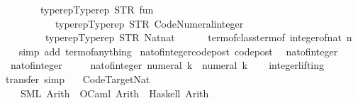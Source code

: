 \begin{isabellebody}
\ \ \ \ \ \ \ \ {\isacharparenleft}typerep{\isachardot}Typerep\ {\isacharparenleft}STR\ {\isacharprime}{\isacharprime}fun{\isacharprime}{\isacharprime}{\isacharparenright}\isanewline
\ \ \ \ \ \ \ \ \ \ \ {\isacharbrackleft}typerep{\isachardot}Typerep\ {\isacharparenleft}STR\ {\isacharprime}{\isacharprime}Code{\isacharunderscore}Numeral{\isachardot}integer{\isacharprime}{\isacharprime}{\isacharparenright}\ {\isacharbrackleft}{\isacharbrackright}{\isacharcomma}\isanewline
\ \ \ \ \ \ \ \ \ typerep{\isachardot}Typerep\ {\isacharparenleft}STR\ {\isacharprime}{\isacharprime}Nat{\isachardot}nat{\isacharprime}{\isacharprime}{\isacharparenright}\ {\isacharbrackleft}{\isacharbrackright}{\isacharbrackright}{\isacharparenright}{\isacharparenright}\isanewline
\ \ \ \ \ {\isacharparenleft}term{\isacharunderscore}of{\isacharunderscore}class{\isachardot}term{\isacharunderscore}of\ {\isacharparenleft}integer{\isacharunderscore}of{\isacharunderscore}nat\ n{\isacharparenright}{\isacharparenright}{\isachardoublequoteclose}\isanewline
%
\isadelimproof
\ \ %
\endisadelimproof
%
\isatagproof
{}\isamarkupfalse%
\ {\isacharparenleft}simp\ add{\isacharcolon}\ term{\isacharunderscore}of{\isacharunderscore}anything{\isacharparenright}%
\endisatagproof
{\isafoldproof}%
%
\isadelimproof
\isanewline
%
\endisadelimproof
\isanewline
{}\isamarkupfalse%
\ nat{\isacharunderscore}of{\isacharunderscore}integer{\isacharunderscore}code{\isacharunderscore}post\ {\isacharbrackleft}code{\isacharunderscore}post{\isacharbrackright}{\isacharcolon}\isanewline
\ \ {\isachardoublequoteopen}nat{\isacharunderscore}of{\isacharunderscore}integer\ {}\ {\isacharequal}\ {}{\isachardoublequoteclose}\isanewline
\ \ {\isachardoublequoteopen}nat{\isacharunderscore}of{\isacharunderscore}integer\ {}\ {\isacharequal}\ {}{\isachardoublequoteclose}\isanewline
\ \ {\isachardoublequoteopen}nat{\isacharunderscore}of{\isacharunderscore}integer\ {\isacharparenleft}numeral\ k{\isacharparenright}\ {\isacharequal}\ numeral\ k{\isachardoublequoteclose}\isanewline
\ \ \isamarkupfalse%
\ integer{\isachardot}lifting%
\isadelimproof
\ %
\endisadelimproof
%
\isatagproof
{}\isamarkupfalse%
\ {\isacharparenleft}transfer{\isacharcomma}\ simp{\isacharparenright}{\isacharplus}%
\endisatagproof
{\isafoldproof}%
%
\isadelimproof
%
\endisadelimproof
\isanewline
\isanewline
{}\isamarkupfalse%
\isanewline
\ \ \ Code{\isacharunderscore}Target{\isacharunderscore}Nat\ {\isasymrightharpoonup}\isanewline
\ \ \ \ {\isacharparenleft}SML{\isacharparenright}\ Arith\ \ {\isacharparenleft}OCaml{\isacharparenright}\ Arith\ \ {\isacharparenleft}Haskell{\isacharparenright}\ Arith\isanewline
%
\isadelimtheory
\isanewline
%
\endisadelimtheory
%
\isatagtheory
{}\isamarkupfalse%
%
\endisatagtheory
{\isafoldtheory}%
%
\isadelimtheory
%
\endisadelimtheory
\end{isabellebody}%
